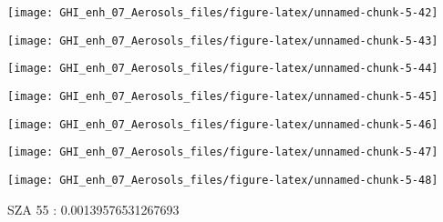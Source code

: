 \documentclass[
  10pt,
  a4paper,oneside]{article}
\begin{document}
\begin{center}\texttt{[image: GHI\_enh\_07\_Aerosols\_files/figure-latex/unnamed-chunk-5-42]} \end{center}

\begin{center}\texttt{[image: GHI\_enh\_07\_Aerosols\_files/figure-latex/unnamed-chunk-5-43]} \end{center}

\begin{center}\texttt{[image: GHI\_enh\_07\_Aerosols\_files/figure-latex/unnamed-chunk-5-44]} \end{center}

\begin{center}\texttt{[image: GHI\_enh\_07\_Aerosols\_files/figure-latex/unnamed-chunk-5-45]} \end{center}

\begin{center}\texttt{[image: GHI\_enh\_07\_Aerosols\_files/figure-latex/unnamed-chunk-5-46]} \end{center}

\begin{center}\texttt{[image: GHI\_enh\_07\_Aerosols\_files/figure-latex/unnamed-chunk-5-47]} \end{center}

\begin{center}\texttt{[image: GHI\_enh\_07\_Aerosols\_files/figure-latex/unnamed-chunk-5-48]} \end{center}

SZA 55 : 0.00139576531267693
\end{document}
